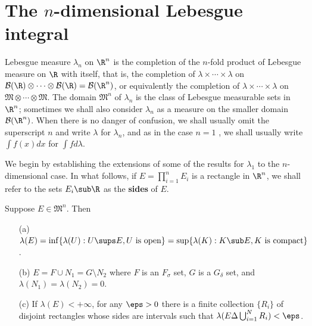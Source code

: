 \section{The \boldmath\texorpdfstring{$n$}{n}-dimensional Lebesgue integral}
Lebesgue measure $\lambda_n$ on $\R^n$ is the completion of the $n$-fold product of Lebesgue measure on $\R$ with itself, that is, the completion of $\lambda\times\cdots\times\lambda$ on $\mathcal{B}(\R)\otimes\cdots\otimes\mathcal{B}(\R)=\mathcal{B}(\R^n)$, or equivalently the completion of $\lambda\times\cdots\times\lambda$ on $\mathfrak{M}\otimes\cdots\otimes\mathfrak{M}$. The domain $\mathfrak{M}^n$ of $\lambda_n$ is the class of Lebesgue measurable sets in $\R^n$; sometimes we shall also consider $\lambda_n$ as a measure on the smaller domain $\mathcal{B}(\R^n)$. When there is no danger of confusion, we shall usually omit the superscript $n$ and write $\lambda$ for $\lambda_n$, and as in the case $n=1$ , we shall usually write $\int f(x)dx$ for $\int f d\lambda$.\par
We begin by establishing the extensions of some of the results for $\lambda_1$ to the $n$-dimensional case. In what follows, if $E=\prod_{i=1}^{n}E_i$ is a rectangle in $\R^n$, we shall refer to the sets $E_i\sub\R$ as the \textbf{sides} of $E$.
\begin{theorem}\label{measurable Lebesgue R^n iff}
Suppose $E\in\mathfrak{M}^n$. Then 
\begin{itemize}
\item[(a)] $\lambda(E)=\inf\{\lambda(U):U\sups E,\text{$U$ is open}\}=\sup\{\lambda(K):K\sub E,\text{$K$ is compact}\}$.
\item[(b)] $E=F\cup N_1=G\setminus N_2$ where $F$ is an $F_\sigma$ set, $G$ is a $G_\delta$ set, and $\lambda(N_1)=\lambda(N_2)=0$.
\item[(c)] If $\lambda(E)<+\infty$, for any $\eps>0$ there is a finite collection $\{R_i\}$ of disjoint rectangles whose sides are intervals such that $\lambda(E\Delta\bigcup_{i=1}^{N}R_i)<\eps$.
\end{itemize}
\end{theorem}
